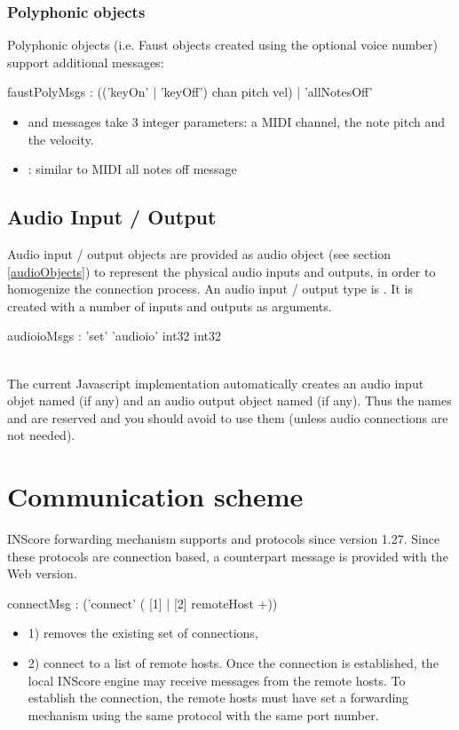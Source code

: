 \documentclass[a4paper,twoside]{article}
\newcommand{\toplevel}[1]	{\section{#1}}
\newcommand{\sublevel}[1]	{\subsection{#1}}
\newcommand{\subsublevel}[1]	{\subsubsection{#1}}
\begin{document}
\subsublevel{Polyphonic objects}
\label{webFaustPoly}

Polyphonic objects (i.e. Faust objects created using the optional voice number) support additional messages:

\begin{rail}
faustPolyMsgs : (('keyOn' | 'keyOff') chan pitch vel)
				| 'allNotesOff'
\end{rail}

\begin{itemize}
\item {} and  messages take 3 integer parameters: a MIDI channel, the note pitch and the velocity.
\item {}: similar to MIDI all notes off message
\end{itemize}

\sublevel{Audio Input / Output}
\label{audioioObjects}

Audio input / output objects are provided as audio object (see section \ref{audioObjects}) to represent the physical audio inputs and outputs, in order to homogenize the connection process.
An audio input / output type is . It is created with a number of inputs and outputs as arguments.

\begin{rail}
audioioMsgs : 'set' 'audioio' int32 int32
\end{rail}

\note\\
The current Javascript implementation automatically creates an audio input objet named  (if any) and an audio output object named   (if any). Thus the names  and  are reserved and you should avoid to use them (unless audio connections are not needed).
 

\toplevel{Communication scheme}
\label{communication}

INScore forwarding mechanism supports  and  protocols since version 1.27. Since these protocols are connection based, a counterpart  message is provided with the Web version.

\begin{rail}
connectMsg : ('connect' ( [1] | [2] remoteHost +))
\end{rail}

\begin{itemize}
\item 1) removes the existing set of connections,
\item 2) connect to a list of remote hosts. Once the connection is established, the local INScore engine may receive messages from the remote hosts. To establish the connection, the remote hosts must have set a forwarding mechanism using the same protocol with the same port number. 
\end{itemize}
\end{document}
